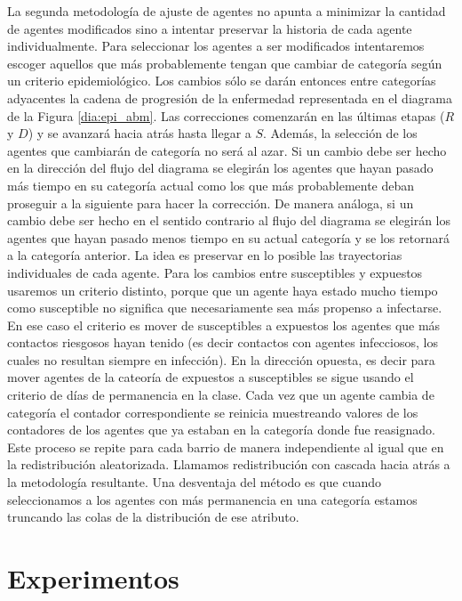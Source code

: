 La segunda metodología de ajuste de agentes no apunta a minimizar la cantidad de agentes modificados sino a intentar preservar la historia de cada agente individualmente. Para seleccionar los agentes a ser modificados intentaremos escoger aquellos que más probablemente tengan que cambiar de categoría según un criterio epidemiológico. Los cambios sólo se darán entonces entre categorías adyacentes la cadena de progresión de la enfermedad representada en el diagrama de la Figura \ref{dia:epi_abm}. Las correcciones comenzarán en las últimas etapas ($R$ y $D$) y se avanzará hacia atrás hasta llegar a $S$. Además, la selección de los agentes que cambiarán de categoría no será al azar. Si un cambio debe ser hecho en la dirección del flujo del diagrama se elegirán los agentes que hayan pasado más tiempo en su categoría actual como los que más probablemente deban proseguir a la siguiente para hacer la corrección. De manera análoga, si un cambio debe ser hecho en el sentido contrario al flujo del diagrama se elegirán los agentes que hayan pasado menos tiempo en su actual categoría y se los retornará a la categoría anterior. La idea es preservar en lo posible las trayectorias individuales de cada agente. Para los cambios entre susceptibles y expuestos usaremos un criterio distinto, porque que un agente haya estado mucho tiempo como susceptible no significa que necesariamente sea más propenso a infectarse. En ese caso el criterio es mover de susceptibles a expuestos los agentes que más contactos riesgosos hayan tenido (es decir contactos con agentes infecciosos, los cuales no resultan siempre en infección). En la dirección opuesta, es decir para mover agentes de la cateoría de expuestos a susceptibles se sigue usando el criterio de días de permanencia en la clase. Cada vez que un agente cambia de categoría el contador correspondiente se reinicia muestreando valores de los contadores de los agentes que ya estaban en la categoría donde fue reasignado. Este proceso se repite para cada barrio de manera independiente al igual que en la redistribución aleatorizada. Llamamos redistribución con cascada hacia atrás a la metodología resultante. Una desventaja del método es que cuando seleccionamos a los agentes con más permanencia en una categoría estamos truncando las colas de la distribución de ese atributo.

\section{Experimentos}
